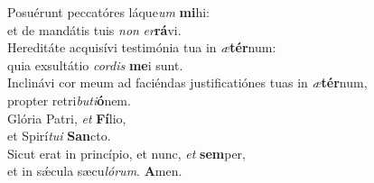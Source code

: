\evenverse Posuérunt peccatóres láque\textit{um} \textbf{mi}hi:~\*\\
\evenverse et de mandátis tuis \textit{non} \textit{er}\textbf{rá}vi.\\
\oddverse Hereditáte acquisívi testimónia tua in \textit{æ}\textbf{tér}num:~\*\\
\oddverse quia exsultátio \textit{cor}\textit{dis} \textbf{me}i sunt.\\
\evenverse Inclinávi cor meum ad faciéndas justificatiónes tuas in \textit{æ}\textbf{tér}num,~\*\\
\evenverse propter retri\textit{bu}\textit{ti}\textbf{ó}nem.\\
\oddverse Glória Patri, \textit{et} \textbf{Fí}lio,~\*\\
\oddverse et Spirí\textit{tu}\textit{i} \textbf{San}cto.\\
\evenverse Sicut erat in princípio, et nunc, \textit{et} \textbf{sem}per,~\*\\
\evenverse et in sǽcula sæcu\textit{ló}\textit{rum}. \textbf{A}men.\\
